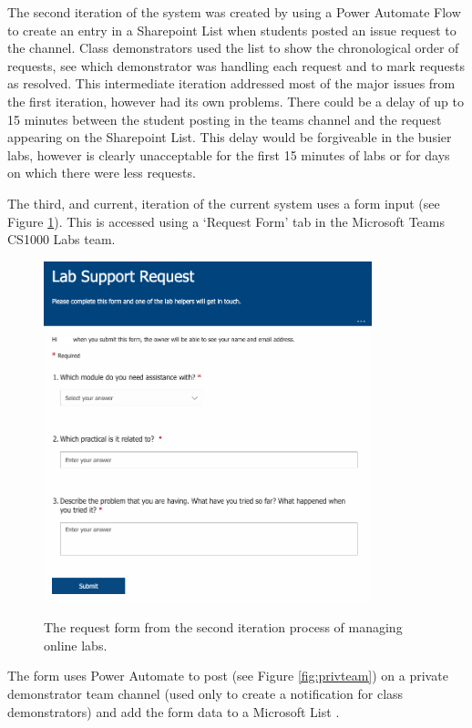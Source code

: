 The second iteration of the system was created by using a Power Automate Flow to create an entry in a Sharepoint List when students posted an issue request to the channel. Class demonstrators used the list to show the chronological order of requests, see which demonstrator was handling each request and to mark requests as resolved. This intermediate iteration addressed most of the major issues from the first iteration, however had its own problems. There could be a delay of up to 15 minutes between the student posting in the teams channel and the request appearing on the Sharepoint List. This delay would be forgiveable in the busier labs, however is clearly unacceptable for the first 15 minutes of labs or for days on which there were less requests.

The third, and current, iteration of the current system uses a form input (see Figure \ref{fig:form}). This is accessed using a `Request Form' tab in the Microsoft Teams \cite{teams} CS1000 Labs team. 

\FloatBarrier
\begin{figure}[H]
  \centering
  \includegraphics[width=0.85\textwidth]{2context/images/teams2a.png}
    \label{fig:form}
  \caption{The request form from the second iteration process of managing online labs.}
\end{figure}

The form uses Power Automate \cite{pauto} to post (see Figure \ref{fig:privteam}) on a private demonstrator team channel (used only to create a notification for class demonstrators) and add the form data to a Microsoft List \cite{lists}.

